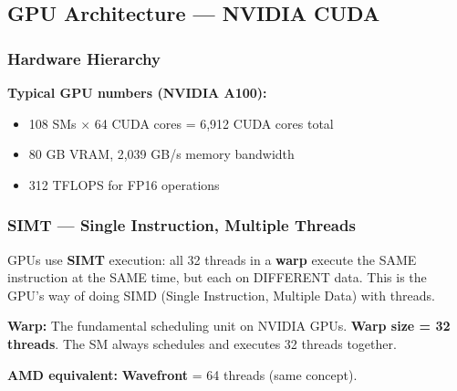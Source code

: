 \documentclass[11pt,a4paper]{article}
\newcommand{\term}[1]{\textbf{\color{darkblue}#1}}
\begin{document}
\subsection{GPU Architecture --- NVIDIA CUDA}

\subsubsection{Hardware Hierarchy}

\begin{center}
\end{center}

\textbf{Typical GPU numbers (NVIDIA A100):}
\begin{itemize}[noitemsep]
  \item 108 SMs $\times$ 64 CUDA cores = 6,912 CUDA cores total
  \item 80 GB VRAM, 2,039 GB/s memory bandwidth
  \item 312 TFLOPS for FP16 operations
\end{itemize}

\subsubsection{SIMT --- Single Instruction, Multiple Threads}

GPUs use \term{SIMT} execution: all 32 threads in a \term{warp} execute the SAME instruction at the SAME time, but each on DIFFERENT data. This is the GPU's way of doing SIMD (Single Instruction, Multiple Data) with threads.

\textbf{Warp:} The fundamental scheduling unit on NVIDIA GPUs. \textbf{Warp size = 32 threads}. The SM always schedules and executes 32 threads together.

\textbf{AMD equivalent:} \term{Wavefront} = 64 threads (same concept).
\end{document}
